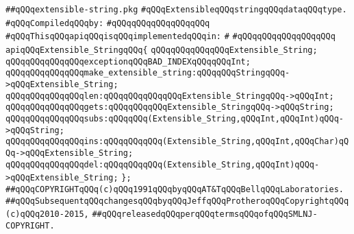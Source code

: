 \label{src/lib/x-kit/widget/old/text/extensible-string.api}
\verb|##qQQqextensible-string.pkg|\newline
\verb|#qQQqExtensibleqQQqstringqQQqdataqQQqtype.|\newline
\newline
\verb|#qQQqCompiledqQQqby:|\newline
\verb|#qQQqqQQqqQQqqQQqqQQq|\newline
\newline
\verb|#qQQqThisqQQqapiqQQqisqQQqimplementedqQQqin:|\newline
\verb|#|\newline
\verb|#qQQqqQQqqQQqqQQqqQQq|\newline
\newline
\newline
\verb|apiqQQqExtensible_StringqQQq{|\newline
\newline
\verb|qQQqqQQqqQQqqQQqExtensible_String;|\newline
\newline
\verb|qQQqqQQqqQQqqQQqexceptionqQQqBAD_INDEXqQQqqQQqInt;|\newline
\newline
\verb|qQQqqQQqqQQqqQQqmake_extensible_string:qQQqqQQqStringqQQq->qQQqExtensible_String;|\newline
\newline
\verb|qQQqqQQqqQQqqQQqlen:qQQqqQQqqQQqqQQqExtensible_StringqQQq->qQQqInt;|\newline
\verb|qQQqqQQqqQQqqQQqgets:qQQqqQQqqQQqExtensible_StringqQQq->qQQqString;|\newline
\verb|qQQqqQQqqQQqqQQqsubs:qQQqqQQq(Extensible_String,qQQqInt,qQQqInt)qQQq->qQQqString;|\newline
\verb|qQQqqQQqqQQqqQQqins:qQQqqQQqqQQq(Extensible_String,qQQqInt,qQQqChar)qQQq->qQQqExtensible_String;|\newline
\verb|qQQqqQQqqQQqqQQqdel:qQQqqQQqqQQq(Extensible_String,qQQqInt)qQQq->qQQqExtensible_String;|\newline
\newline
\verb|};|\newline
\newline
\newline
\newline
\verb|##qQQqCOPYRIGHTqQQq(c)qQQq1991qQQqbyqQQqAT&TqQQqBellqQQqLaboratories.|\newline
\verb|##qQQqSubsequentqQQqchangesqQQqbyqQQqJeffqQQqProtheroqQQqCopyrightqQQq(c)qQQq2010-2015,|\newline
\verb|##qQQqreleasedqQQqperqQQqtermsqQQqofqQQqSMLNJ-COPYRIGHT.|\newline

